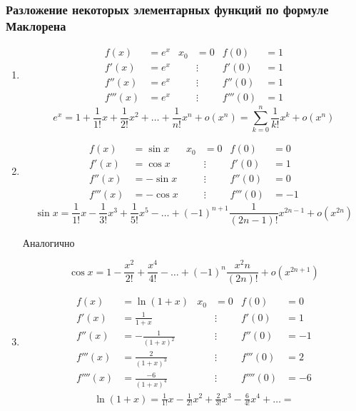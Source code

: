 \documentclass[12pt]{article}
\begin{document}
    \subsubsection*{Разложение некоторых элементарных функций по формуле Маклорена}
    \begin{enumerate}
        \item \begin{align*}
            f(x) &= e^x & x_0 &= 0 & f(0) &= 1\\
            f'(x) &= e^x & &\vdots & f'(0) &= 1\\
            f''(x) &= e^x & &\vdots & f''(0) &= 1\\
            f'''(x) &= e^x & &\vdots & f'''(0) &= 1
        \end{align*}
        \[ e^x = 1 + \frac{1}{1!}x + \frac{1}{2!}x^2 + \dots + \frac{1}{n!}x^n + o(x^n) = \sum_{k=0}^{n} \frac{1}{k!}x^k + o(x^n) \]
        \item \begin{align*}
            f(x) &= \sin x & x_0 &= 0 & f(0) &= 0\\
            f'(x) &= \cos x & &\vdots & f'(0) &= 1\\
            f''(x) &= -\sin x & &\vdots & f''(0) &= 0\\
            f'''(x) &= -\cos x & &\vdots & f'''(0) &= -1
        \end{align*}
        \[ \sin x = \frac{1}{1!}x - \frac{1}{3!}x^3 + \frac{1}{5!}x^5 - \dots + (-1)^{n+1}\frac{1}{(2n-1)!}x^{2n-1} + o(x^{2n}) \]
        \begin{center}
            Аналогично
        \end{center}
        \[ \cos x = 1 - \frac{x^2}{2!} + \frac{x^4}{4!} - \dots + (-1)^{n}\frac{x^2n}{(2n)!} + o(x^{2n+1}) \]
        \item \begin{align*}
            f(x) &= \ln (1 + x) & x_0 &= 0 & f(0) &= 0\\
            f'(x) &= \frac{1}{1+x} & &\vdots & f'(0) &= 1\\
            f''(x) &= -\frac{1}{(1+x)^2} & &\vdots & f''(0) &= -1\\
            f'''(x) &= \frac{2}{(1+x)^3} & &\vdots & f'''(0) &= 2\\
            f''''(x) &= \frac{-6}{(1+x)^4} & &\vdots & f''''(0) &= -6
        \end{align*}
        \begin{multline*}
            \ln(1+x) = \frac{1}{1!}x - \frac{1}{2!}x^2 + \frac{2}{3!}x^3 - \frac{6}{4!}x^4 + \dots =\\

\end{multline*}
\end{enumerate}
\end{document}

